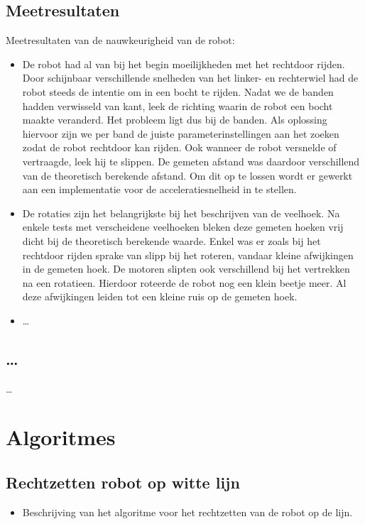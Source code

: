 \documentclass[tt1]{penoverslag}
\begin{document}
\subsection{Meetresultaten}
Meetresultaten van de nauwkeurigheid van de robot:
\begin{itemize}
\item De robot had al van bij het begin moeilijkheden met het rechtdoor rijden. Door schijnbaar verschillende snelheden van het linker- en rechterwiel
had de robot steeds de intentie om in een bocht te rijden. Nadat we de banden hadden verwisseld van kant, leek de richting waarin de robot een bocht maakte veranderd. Het probleem ligt dus bij de banden. Als oplossing hiervoor zijn we per band de juiste parameterinstellingen aan het zoeken zodat de robot rechtdoor kan rijden.%
Ook wanneer de robot versnelde of vertraagde, leek hij te slippen. De gemeten afstand was daardoor verschillend van de theoretisch berekende afstand. Om dit op te lossen wordt er gewerkt aan een implementatie voor de acceleratiesnelheid in te stellen.
\item De rotaties zijn het belangrijkste bij het beschrijven van de veelhoek. Na enkele tests met verscheidene veelhoeken bleken deze gemeten hoeken vrij dicht bij de theoretisch berekende waarde. Enkel was er zoals bij het rechtdoor rijden sprake van slipp bij het roteren, vandaar kleine afwijkingen in de gemeten hoek. De motoren slipten ook verschillend bij het vertrekken na een rotatieen. Hierdoor roteerde de robot nog een klein beetje meer. 
Al deze afwijkingen leiden tot een kleine ruis op de gemeten hoek.
\item \ldots %
\end{itemize}

\subsection{\ldots}
\ldots


\section{Algoritmes}
\lipsum[4]

\subsection{Rechtzetten robot op witte lijn}
\begin{itemize}
\item Beschrijving van het algoritme voor het rechtzetten van de robot op de lijn.
\end{itemize}
\end{document}
